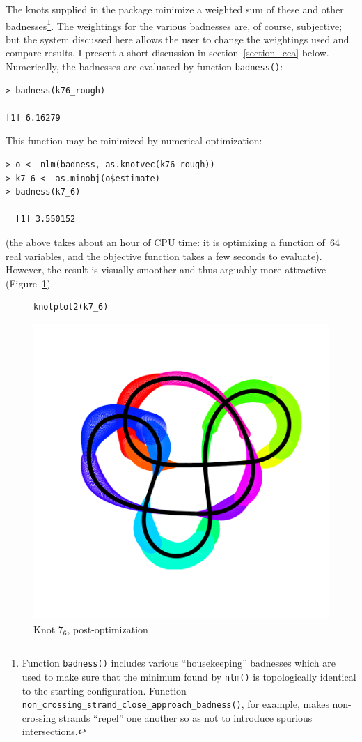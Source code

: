\documentclass{birkjour}
\theoremstyle{definition}
\theoremstyle{remark}
\numberwithin{equation}{section}
\begin{document}
The knots supplied in the package minimize a weighted sum of these and
other badnesses\footnote{Function {\tt badness()} includes various
``housekeeping'' badnesses which are used to make sure that the
minimum found by {\tt nlm()} is topologically identical to the
starting configuration.  Function {\tt
  non\_crossing\_strand\_close\_approach\_badness()}, for example,
makes non-crossing strands ``repel'' one another so as not to
introduce spurious intersections.}.  The weightings for the various
badnesses are, of course, subjective; but the system discussed here
allows the user to change the weightings used and compare results.  I
present a short discussion in section~\ref{section_cca} below.
Numerically, the badnesses are evaluated by function {\tt badness()}:

\begin{verbatim}
> badness(k76_rough)

[1] 6.16279
\end{verbatim}

This function may be minimized by numerical optimization:

\begin{verbatim}
> o <- nlm(badness, as.knotvec(k76_rough))
> k7_6 <- as.minobj(o$estimate)
> badness(k7_6)

  [1] 3.550152
\end{verbatim}

(the above takes about an hour of CPU time: it is optimizing a
function of~64 real variables, and the objective function takes a few
seconds to evaluate).  However, the result is visually smoother and
thus arguably more attractive (Figure~\ref{7_6}).

\begin{figure}[!tbp]
\begin{verbatim}
knotplot2(k7_6)
\end{verbatim}
  \centering
\includegraphics[scale = 0.9]{knot-k76_knotplot2}
\caption{Knot $7_6$, post-optimization\label{7_6}}
\end{figure}
   
\end{document}
